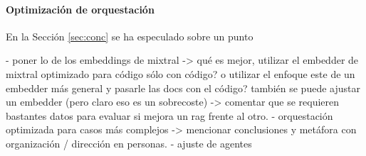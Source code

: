 \paragraph{Optimización de orquestación} En la Sección \ref{sec:conc} se ha especulado sobre un punto  

- poner lo de los embeddings de mixtral -> qué es mejor, utilizar el embedder de mixtral optimizado para código sólo con código? o utilizar el enfoque este de un embedder más general y pasarle las docs con el código? también se puede ajustar un embedder (pero claro eso es un sobrecoste) -> comentar que se requieren bastantes datos para evaluar si mejora un rag frente al otro.  
- orquestación optimizada para casos más complejos -> mencionar conclusiones y metáfora con organización / dirección en personas. 
- ajuste de agentes 


